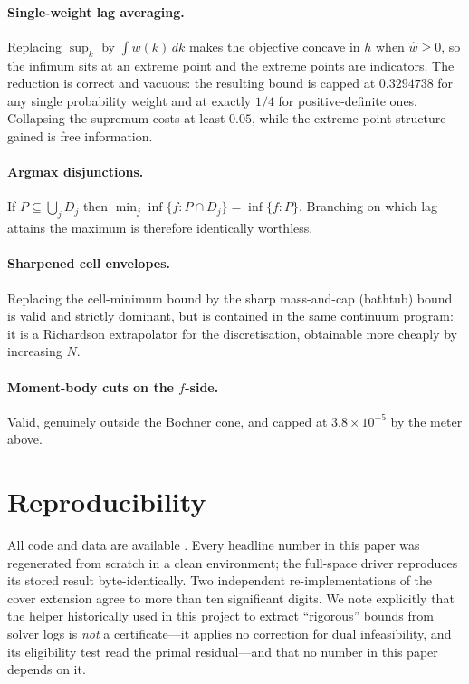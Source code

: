 \documentclass[11pt]{article}
\theoremstyle{definition}
\begin{document}
\paragraph{Single-weight lag averaging.} Replacing $\sup_k$ by
$\int w(k)\,dk$ makes the objective concave in $h$ when $\hat w \ge 0$,
so the infimum sits at an extreme point and the extreme points are
indicators. The reduction is correct and vacuous: the resulting bound is
capped at $0.3294738$ for any single probability weight and at exactly
$1/4$ for positive-definite ones. Collapsing the supremum costs at least
$0.05$, while the extreme-point structure gained is free information.

\paragraph{Argmax disjunctions.} If $P \subseteq \bigcup_j D_j$ then
$\min_j \inf\{f : P \cap D_j\} = \inf\{f : P\}$. Branching on which lag
attains the maximum is therefore identically worthless.

\paragraph{Sharpened cell envelopes.} Replacing the cell-minimum bound by
the sharp mass-and-cap (bathtub) bound is valid and strictly dominant,
but is contained in the same continuum program: it is a Richardson
extrapolator for the discretisation, obtainable more cheaply by
increasing $N$.

\paragraph{Moment-body cuts on the $f$-side.} Valid, genuinely outside
the Bochner cone, and capped at $3.8\times10^{-5}$ by the meter above.

\section{Reproducibility}\label{sec:repro}

All code and data are available \cite{repo}. Every headline number in
this paper was regenerated from scratch in a clean environment; the
full-space driver reproduces its stored result byte-identically. Two
independent re-implementations of the cover extension agree to more than
ten significant digits. We note explicitly that the helper historically
used in this project to extract ``rigorous'' bounds from solver logs is
\emph{not} a certificate---it applies no correction for dual
infeasibility, and its eligibility test read the primal residual---and
that no number in this paper depends on it.
\end{document}
